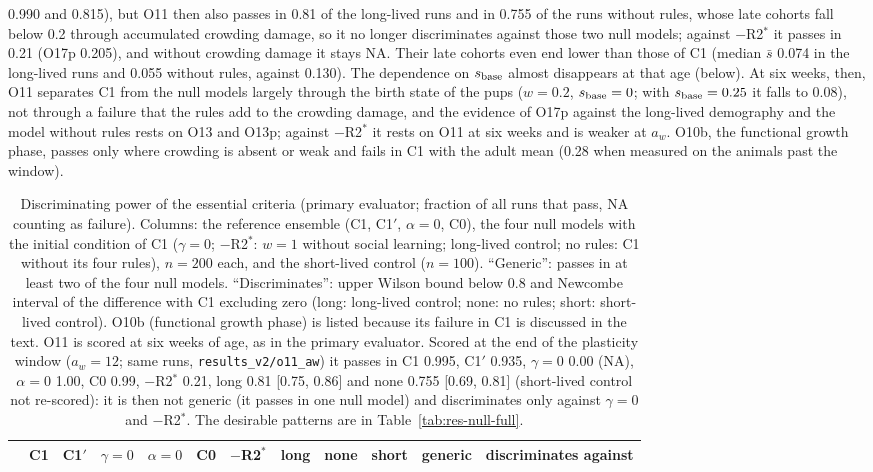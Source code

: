 0.990 and 0.815), but O11 then also passes in 0.81 of the long-lived runs and in 0.755 of the runs without rules,
whose late cohorts fall below 0.2 through accumulated crowding damage, so it no longer discriminates against those
two null models; against $-$R2$^*$ it passes in 0.21 (O17p 0.205), and without crowding damage it stays NA. Their late cohorts even end lower than those of \textsf{C1} (median $\bar s$ 0.074 in the long-lived runs and
0.055 without rules, against 0.130). The dependence on $s_{\rm base}$ almost disappears at that age (below). At six
weeks, then, O11 separates \textsf{C1} from the null models largely through the birth state of the pups
($w=0.2$, $s_{\rm base}=0$; with $s_{\rm base}=0.25$ it falls to 0.08), not through a failure that the rules add to
the crowding damage, and the evidence of O17p against the long-lived
demography and the model without rules rests on O13 and O13p; against $-$R2$^*$ it rests on O11 at six weeks and is
weaker at $a_w$. O10b, the functional growth phase, passes only where crowding is absent or weak and fails in
\textsf{C1} with the adult mean (0.28 when measured on the animals past the window).

\begin{table}[t]
\centering
\caption{Discriminating power of the essential criteria (primary evaluator; fraction of all runs that pass, NA
counting as failure). Columns: the reference ensemble (\textsf{C1}, \textsf{C1}$'$, $\alpha=0$, \textsf{C0}), the
four null models with the initial condition of \textsf{C1} ($\gamma=0$; $-$R2$^*$: $w=1$ without social learning;
long-lived control; no rules: \textsf{C1} without its four rules), $n=200$ each, and the short-lived control
($n=100$). ``Generic'': passes in at least two of
the four null models. ``Discriminates'': upper Wilson bound below 0.8 and Newcombe interval of the difference with
\textsf{C1} excluding zero (long: long-lived control; none: no rules; short: short-lived control). O10b (functional growth phase) is
listed because its failure in \textsf{C1} is discussed in the text. O11 is scored at six weeks of age, as in the
primary evaluator. Scored at the end of the plasticity window ($a_w=12$; same runs, \texttt{results\_v2/o11\_aw}) it
passes in \textsf{C1} 0.995, \textsf{C1}$'$ 0.935, $\gamma{=}0$ 0.00 (NA), $\alpha{=}0$ 1.00, \textsf{C0} 0.99,
$-$R2$^*$ 0.21, long 0.81 [0.75, 0.86] and none 0.755 [0.69, 0.81] (short-lived control not re-scored): it is then not
generic (it passes in one null model) and discriminates only against $\gamma{=}0$ and $-$R2$^*$. The desirable
patterns are in Table~\ref{tab:res-null-full}.}
\label{tab:res-null}
\footnotesize
\setlength{\tabcolsep}{3.2pt}
\begin{tabular}{@{}lccccccccccl@{}}
\toprule
& \textsf{C1} & \textsf{C1}$'$ & $\gamma{=}0$ & $\alpha{=}0$ & \textsf{C0} & $-$R2$^*$ & long & none & short & generic & discriminates against \\
\midrule

\end{tabular}
\end{table}


